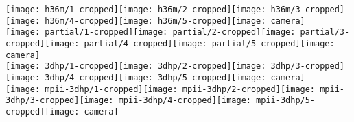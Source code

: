 \begin{figure*}
\centering
\newlength{\imageheight}
\newlength{\imagegap}
\setlength{\labelsize}{14mm}
\setlength{\imageheight}{28mm}
\setlength{\imagegap}{0.8mm}
\texttt{[image: h36m/1-cropped]}\hspace{\imagegap}\texttt{[image: h36m/2-cropped]}\hspace{\imagegap}\texttt{[image: h36m/3-cropped]}\hspace{\imagegap}\texttt{[image: h36m/4-cropped]}\hspace{\imagegap}\texttt{[image: h36m/5-cropped]}\hspace{-2.5mm}\texttt{[image: camera]}\\
\texttt{[image: partial/1-cropped]}\hspace{\imagegap}\texttt{[image: partial/2-cropped]}\hspace{\imagegap}\texttt{[image: partial/3-cropped]}\hspace{\imagegap}\texttt{[image: partial/4-cropped]}\hspace{\imagegap}\texttt{[image: partial/5-cropped]}\hspace{-2.5mm}\texttt{[image: camera]}\\ 	
\texttt{[image: 3dhp/1-cropped]}\hspace{\imagegap}\texttt{[image: 3dhp/2-cropped]}\hspace{\imagegap}\texttt{[image: 3dhp/3-cropped]}\hspace{\imagegap}\texttt{[image: 3dhp/4-cropped]}\hspace{\imagegap}\texttt{[image: 3dhp/5-cropped]}\hspace{-2.5mm}\texttt{[image: camera]}\\
\texttt{[image: mpii-3dhp/1-cropped]}\hspace{\imagegap}\texttt{[image: mpii-3dhp/2-cropped]}\hspace{\imagegap}\texttt{[image: mpii-3dhp/3-cropped]}\hspace{\imagegap}\texttt{[image: mpii-3dhp/4-cropped]}\hspace{\imagegap}\texttt{[image: mpii-3dhp/5-cropped]}\hspace{-2.5mm}\texttt{[image: camera]}\\

\end{figure*}
